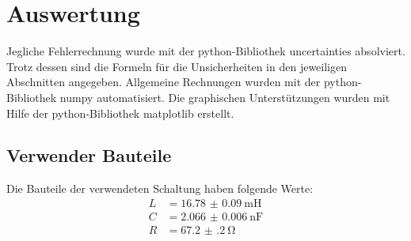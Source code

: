 \section{Auswertung}
\label{sec:Auswertung}
Jegliche Fehlerrechnung wurde mit der python-Bibliothek uncertainties \cite{uncertainties} absolviert.
Trotz dessen sind die Formeln für die Unsicherheiten in den jeweiligen Abschnitten angegeben.
Allgemeine Rechnungen wurden mit der python-Bibliothek numpy \cite{numpy} automatisiert. 
Die graphischen Unterstützungen wurden mit Hilfe der python-Bibliothek matplotlib \cite{matplotlib} erstellt.\\
\subsection{Verwender Bauteile} \label{subsec:bauteile}
Die Bauteile der verwendeten Schaltung haben folgende Werte:
\begin{align*}
    L   & = \SI{16.78(9)} {\milli\henry}\\
    C   & = \SI{2.066(6)} {\nano\farad} \\
    R   & = \SI{67.2(2)}  {\ohm}
\end{align*}
